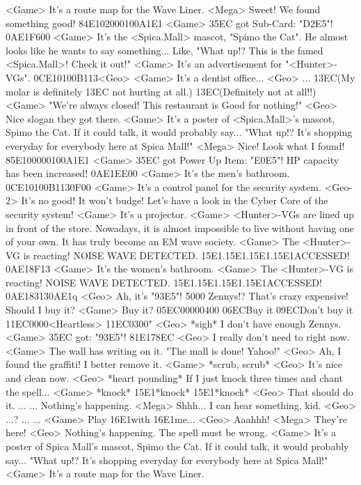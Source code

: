 <Game> It's a route map for the Wave Liner. 
<Mega> Sweet! We found something good! 
{84}{E1}{02}{00}{01}{00}{A1}{E1} 
<Game> {35}{EC} got Sub-Card: "{D2}{E5}"! 
{0A}{E1}{F6}{00}
<Game> It's the <Spica.Mall> mascot, "Spimo the Cat". He almost looks like he wants to say 
something... Like, "What up!? This is the famed <Spica.Mall>! Check it out!" 
<Game> It's an advertisement for "<Hunter>-VGs". 
{0C}{E1}{01}{00}{B1}{13}<Geo>
<Game> It's a dentist office... 
<Geo> ... 
{13}{EC}(My molar is definitely {13}{EC} not hurting at all.) 
{13}{EC}(Definitely not at all!!) 
<Game> "We're always closed!    This restaurant is       Good for nothing!" 
<Geo> Nice slogan they got there. 
<Game> It's a poster of <Spica.Mall>'s mascot, Spimo the Cat. 
If it could talk, it would probably say... 
"What up!? It's shopping everyday for everybody here at Spica Mall!" 
<Mega> Nice! Look what I found! 
{85}{E1}{00}{00}{01}{00}{A1}{E1} 
<Game> {35}{EC} got Power Up Item: "{E0}{E5}"! 
HP capacity has been increased! 
{0A}{E1}{EE}{00}
<Game> It's the men's bathroom. 
{0C}{E1}{01}{00}{B1}{13}{0F}{00}
<Game> It's a control panel for the security system. 
<Geo-2> It's no good! It won't budge! 
Let's have a look in the Cyber Core of the security system! 
<Game> It's a projector. 
<Game> <Hunter>-VGs are lined up in front of the store. 
Nowadays, it is almost impossible to live without having one of your own. 
It has truly become an EM wave society. 
<Game> The <Hunter>-VG is reacting! 
NOISE WAVE DETECTED. {15}{E1}.{15}{E1}.{15}{E1}.{15}{E1}ACCESSED! 
{0A}{E1}{8F}{13}
<Game> It's the women's bathroom. 
<Game> The <Hunter>-VG is reacting! 
NOISE WAVE DETECTED. {15}{E1}.{15}{E1}.{15}{E1}.{15}{E1}ACCESSED! 
{0A}{E1}{83}{13}{0A}{E1}q
<Geo> Ah, it's "{93}{E5}"! 
5000 Zennys!? That's crazy expensive! Should I buy it? 
<Game> Buy it? {05}{EC}{00}{00}{04}{00}  {06}{EC}Buy it   {09}{EC}Don't buy it 
{11}{EC}{00}{00}<Heartless> {11}{EC}{03}{00}"
<Geo> *sigh* I don't have enough Zennys. 
<Game> {35}{EC} got: "{93}{E5}"! 
{81}{E1}{78}{EC}
<Geo> I really don't need to right now. 
<Game> The wall has writing on it. "The mall is done! Yahoo!" 
<Geo> Ah, I found the graffiti! I better remove it. 
<Game> *scrub, scrub* 
<Geo> It's nice and clean now. 
<Geo> *heart pounding* If I just knock three times and chant the spell... 
<Game> *knock* {15}{E1}*knock* {15}{E1}*knock* 
<Geo> That should do it. 
... 
... 
Nothing's happening. 
<Mega> Shhh... I can hear something, kid. 
<Geo> ...? 
... 
... 
<Game> Play {16}{E1}with {16}{E1}me... 
<Geo> Aaahhh! 
<Mega> They're here! 
<Geo> Nothing's happening. The spell must be wrong. 
<Game> It's a poster of Spica Mall's mascot, Spimo the Cat. 
If it could talk, it would probably say... 
"What up!? It's shopping everyday for everybody here at Spica Mall!" 
<Game> It's a route map for the Wave Liner. 

